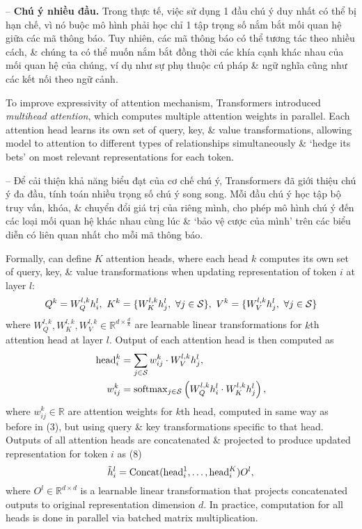 \documentclass{article}
\begin{document}
\begin{itemize}
\begin{itemize}
        -- {\bf Chú ý nhiều đầu.} Trong thực tế, việc sử dụng 1 đầu chú ý duy nhất có thể bị hạn chế, vì nó buộc mô hình phải học chỉ 1 tập trọng số nắm bắt mối quan hệ giữa các mã thông báo. Tuy nhiên, các mã thông báo có thể tương tác theo nhiều cách, \& chúng ta có thể muốn nắm bắt đồng thời các khía cạnh khác nhau của mối quan hệ của chúng, ví dụ như sự phụ thuộc cú pháp \& ngữ nghĩa cũng như các kết nối theo ngữ cảnh.

        To improve expressivity of attention mechanism, Transformers introduced {\it multihead attention}, which computes multiple attention weights in parallel. Each attention head learns its own set of query, key, \& value transformations, allowing model to attention to different types of relationships simultaneously \& `hedge its bets' on most relevant representations for each token.

        -- Để cải thiện khả năng biểu đạt của cơ chế chú ý, Transformers đã giới thiệu chú ý đa đầu, tính toán nhiều trọng số chú ý song song. Mỗi đầu chú ý học tập bộ truy vấn, khóa, \& chuyển đổi giá trị của riêng mình, cho phép mô hình chú ý đến các loại mối quan hệ khác nhau cùng lúc \& `bảo vệ cược của mình' trên các biểu diễn có liên quan nhất cho mỗi mã thông báo.

        Formally, can define $K$ attention heads, where each head $k$ computes its own set of query, key, \& value transformations when updating representation of token $i$ at layer $l$:
        \begin{equation*}
            Q^k = W_Q^{l,k}h_i^l,\ K^k = \{W_K^{l,k}h_j^l,\ \forall j\in{\cal S}\},\ V^k = \{W_V^{l,k}h_j^l,\ \forall j\in{\cal S}\}
        \end{equation*}
        where $W_Q^{l,k},W_K^{l,k},W_V^{l,k}\in\mathbb{R}^{d\times\frac{d}{k}}$ are learnable linear transformations for $k$th attention head at layer $l$. Output of each attention head is then computed as
        \begin{align*}
            {\rm head}_i^k &= \sum_{j\in{\cal S}} w_{ij}^k\cdot W_V^{l,k}h_j^l,\\
            w_{ij}^k &= {\rm softmax}_{j\in{\cal S}}\left(W_Q^{l,k}h_i^l\cdot W_K^{l,k}h_j^l\right),
        \end{align*}
        where $w_{ij}^k\in\mathbb{R}$ are attention weights for $k$th head, computed in same way as before in (3), but using query \& key transformations specific to that head. Outputs of all attention heads are concatenated \& projected to produce updated representation for token $i$ as (8)
        \begin{equation*}
            \tilde{h}_i^l = {\rm Concat}({\rm head}_i^1,\ldots,{\rm head}_i^K)O^l,
        \end{equation*}
        where $O^l\in\mathbb{R}^{d\times d}$ is a learnable linear transformation that projects concatenated outputs to original representation dimension $d$. In practice, computation for all heads is done in parallel via batched matrix multiplication.


\end{itemize}
\end{itemize}
\end{document}
